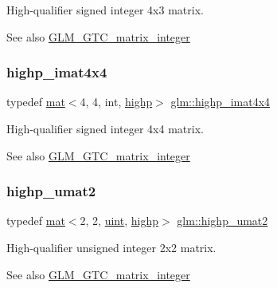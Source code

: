High-\/qualifier signed integer 4x3 matrix. \begin{DoxySeeAlso}{See also}
\hyperlink{group__gtc__matrix__integer}{G\+L\+M\+\_\+\+G\+T\+C\+\_\+matrix\+\_\+integer} 
\end{DoxySeeAlso}
\mbox{\label{group__gtc__matrix__integer_gaae7cdd2394ff80ecf1be6d78bfde629a}} 
\subsubsection{\texorpdfstring{highp\+\_\+imat4x4}{highp\_imat4x4}}
{\footnotesize\ttfamily typedef \hyperlink{structglm_1_1mat}{mat}$<$4, 4, int, \hyperlink{namespaceglm_a36ed105b07c7746804d7fdc7cc90ff25ac6f7eab42eacbb10d59a58e95e362074}{highp}$>$ \hyperlink{group__gtc__matrix__integer_gaae7cdd2394ff80ecf1be6d78bfde629a}{glm\+::highp\+\_\+imat4x4}}

High-\/qualifier signed integer 4x4 matrix. \begin{DoxySeeAlso}{See also}
\hyperlink{group__gtc__matrix__integer}{G\+L\+M\+\_\+\+G\+T\+C\+\_\+matrix\+\_\+integer} 
\end{DoxySeeAlso}
\mbox{\label{group__gtc__matrix__integer_ga0788642172aac0bb6c4c16750c92ed96}} 
\subsubsection{\texorpdfstring{highp\+\_\+umat2}{highp\_umat2}}
{\footnotesize\ttfamily typedef \hyperlink{structglm_1_1mat}{mat}$<$2, 2, \hyperlink{group__core__precision_ga4fd29415871152bfb5abd588334147c8}{uint}, \hyperlink{namespaceglm_a36ed105b07c7746804d7fdc7cc90ff25ac6f7eab42eacbb10d59a58e95e362074}{highp}$>$ \hyperlink{group__gtc__matrix__integer_ga0788642172aac0bb6c4c16750c92ed96}{glm\+::highp\+\_\+umat2}}

High-\/qualifier unsigned integer 2x2 matrix. \begin{DoxySeeAlso}{See also}
\hyperlink{group__gtc__matrix__integer}{G\+L\+M\+\_\+\+G\+T\+C\+\_\+matrix\+\_\+integer} 
\end{DoxySeeAlso}
\mbox{\label{group__gtc__matrix__integer_ga21045c3ef9df4966779713fa1a7b4b52}} 
